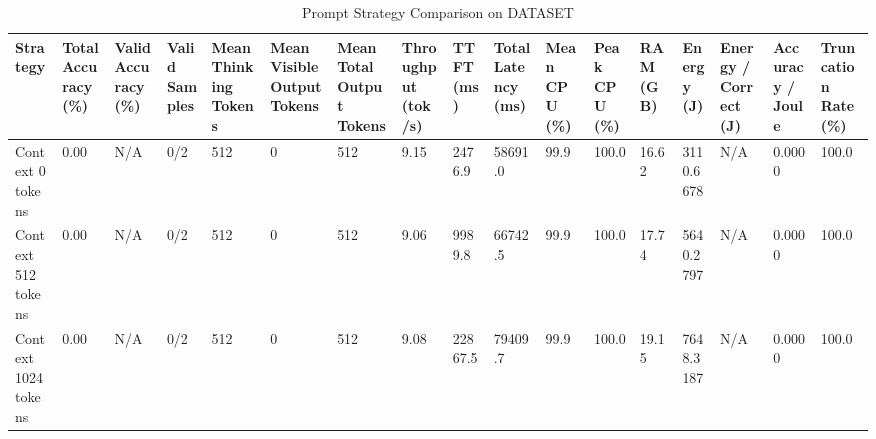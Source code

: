 \begin{table}
\caption{Prompt Strategy Comparison on DATASET}
\label{tab:strategy_comparison}
\begin{tabular}{lllllllllllllllll}
\toprule
Strategy & Total Accuracy (\%) & Valid Accuracy (\%) & Valid Samples & Mean Thinking Tokens & Mean Visible Output Tokens & Mean Total Output Tokens & Throughput (tok/s) & TTFT (ms) & Total Latency (ms) & Mean CPU (\%) & Peak CPU (\%) & RAM (GB) & Energy (J) & Energy / Correct (J) & Accuracy / Joule & Truncation Rate (\%) \\
\midrule
Context 0 tokens & 0.00 & N/A & 0/2 & 512 & 0 & 512 & 9.15 & 2476.9 & 58691.0 & 99.9 & 100.0 & 16.62 & 3110.6678 & N/A & 0.0000 & 100.0 \\
Context 512 tokens & 0.00 & N/A & 0/2 & 512 & 0 & 512 & 9.06 & 9989.8 & 66742.5 & 99.9 & 100.0 & 17.74 & 5640.2797 & N/A & 0.0000 & 100.0 \\
Context 1024 tokens & 0.00 & N/A & 0/2 & 512 & 0 & 512 & 9.08 & 22867.5 & 79409.7 & 99.9 & 100.0 & 19.15 & 7648.3187 & N/A & 0.0000 & 100.0 \\
\bottomrule
\end{tabular}
\end{table}
